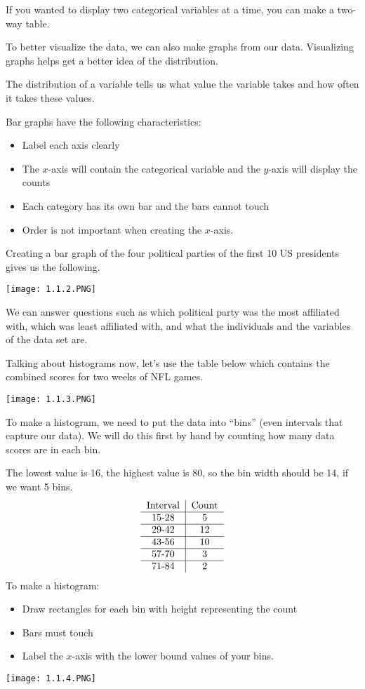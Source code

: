 \documentclass[../stats.tex]{subfiles}
\begin{document}
If you wanted to display two categorical variables at a time, you can make a two-way table. 

To better visualize the data, we can also make graphs from our data. Visualizing graphs helps get a better idea of the distribution.

The distribution of a variable tells us what value the variable takes and how often it takes these values.

Bar graphs have the following characteristics:
\begin{itemize}
    \item Label each axis clearly 
    \item The $x$-axis will contain the categorical variable and the $y$-axis will display the counts 
    \item Each category has its own bar and the bars cannot touch 
    \item Order is not important when creating the $x$-axis.
\end{itemize}

Creating a bar graph of the four political parties of the first 10 US presidents gives us the following.
\begin{center}
    \texttt{[image: 1.1.2.PNG]}
\end{center}

We can answer questions such as which political party was the most affiliated with, which was least affiliated with, and what the individuals and the variables of the data set are.

Talking about histograms now, let's use the table below which contains the combined scores for two weeks of NFL games.
\begin{center}
    \texttt{[image: 1.1.3.PNG]}
\end{center}

To make a histogram, we need to put the data into ``bins'' (even intervals that capture our data). We will do this first by hand by counting how many data scores are in each bin.

The lowest value is 16, the highest value is 80, so the bin width should be 14, if we want 5 bins.
\[ \begin{tabular}{c|c}
    Interval & Count\\\hline
    15-28 & 5\\\hline
    29-42 & 12\\\hline
    43-56 & 10\\\hline
    57-70 & 3\\\hline
    71-84 & 2
\end{tabular}\]
To make a histogram:
\begin{itemize}
    \item Draw rectangles for each bin with height representing the count 
    \item Bars must touch 
    \item Label the $x$-axis with the lower bound values of your bins.
\end{itemize}
\begin{center}
    \texttt{[image: 1.1.4.PNG]}
\end{center}
\end{document}
